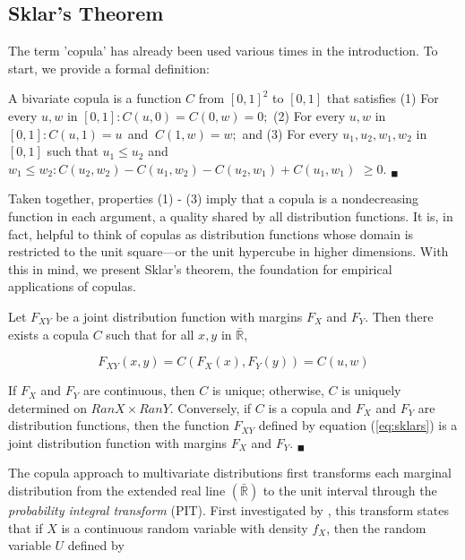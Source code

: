 \subsection{Sklar's Theorem}

The term 'copula' has already been used various times in the introduction. To start, we provide a formal definition:

\begin{definition} \label{defn:copula}
	A bivariate copula is a function $C$ from $\left[0,1\right]^{2}$ to $\left[0,1\right]$ that satisfies (1) For every $u,w$ in $\left[0,1\right] :C\left(u,0\right) = C\left(0,w\right) = 0;$ (2) For every $u,w$ in $\left[0,1\right] :C\left(u,1\right) = u\ \ $and $\ C\left(1,w\right) = w;$ and (3) For every $u_{1}, u_{2}, w_{1}, w_{2}$ in $\left[0,1\right]$ such that $u_{1} \leq u_{2}$ and $w_{1} \leq w_{2}:C\left(u_{2}, w_{2}\right) - C\left(u_{1}, w_{2}\right) - C\left(u_{2}, w_{1}\right) + C\left(u_{1}, w_{1}\right)$ $\geq 0$. $_{\blacksquare}$
\end{definition}

Taken together, properties (1) - (3) imply that a copula is a nondecreasing function in each argument, a quality shared by all distribution functions. It is, in fact, helpful to think of copulas as distribution functions whose domain is restricted to the unit square---or the unit hypercube in higher dimensions. With this in mind, we present Sklar's theorem, the foundation for empirical applications of copulas.

\begin{theorem}[Sklar, 1959] \label{thm:skl}
	Let $F_{XY}$ be a joint distribution function with margins $F_{X}$ and $F_{Y}$. Then there exists a copula $C$ such that for all $x,y$ in $\bar{\mathbb{R}}$,

	\begin{equation} \label{eq:sklars}
		F_{XY}\left( x,y\right) =C\left(F_{X}\left(x\right), F_{Y}\left(y\right)\right) = C\left(u,w\right)
	\end{equation}

	If $F_{X}$ and $F_{Y}$ are continuous, then $C$ is unique; otherwise, $C$ is uniquely determined on $RanX\times RanY$. Conversely, if $C$ is a copula and $F_{X}$ and $F_{Y}$ are distribution functions, then the function $F_{XY}$ defined by equation (\ref{eq:sklars}) is a joint distribution function with margins $F_{X}$ and $F_{Y}$. $_{\blacksquare}$
\end{theorem}

The copula approach to multivariate distributions first transforms each marginal distribution from the extended real line $\left(\bar{\mathbb{R}}\right)$ to the unit interval through the \textit{probability integral transform} (PIT). First investigated by \cite{Rosenblatt_1952}, this transform states that if $X$ is a continuous random variable with density $f_{X}$, then the random variable $U$ defined by

